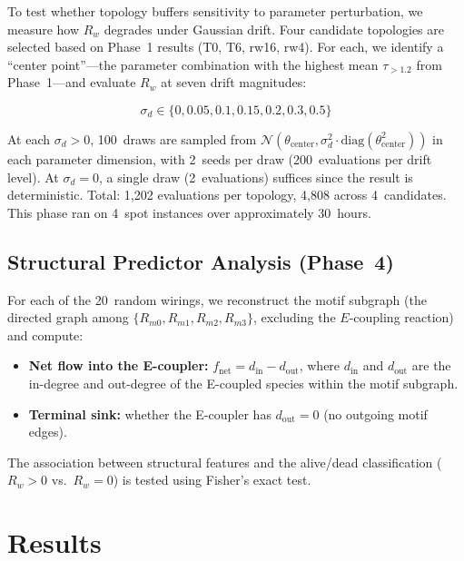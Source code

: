\documentclass[twocolumn,showpacs,preprintnumbers,amsmath,amssymb,prd,floatfix]{revtex4-2}
\newcommand{\tauexp}{\tau_{>1.2}}
\newcommand{\Rw}{R_w}
\renewcommand{\sd}{\sigma_d}
\begin{document}
To test whether topology buffers sensitivity to parameter perturbation, we measure how $\Rw$ degrades under Gaussian drift. Four candidate topologies are selected based on Phase~1 results (T0, T6, rw16, rw4). For each, we identify a ``center point''---the parameter combination with the highest mean $\tauexp$ from Phase~1---and evaluate $\Rw$ at seven drift magnitudes:

\begin{equation}
\sd \in \{0, 0.05, 0.1, 0.15, 0.2, 0.3, 0.5\}
\end{equation}

At each $\sd > 0$, 100~draws are sampled from $\mathcal{N}(\theta_\text{center}, \sd^2 \cdot \text{diag}(\theta_\text{center}^2))$ in each parameter dimension, with 2~seeds per draw (200~evaluations per drift level). At $\sd = 0$, a single draw (2~evaluations) suffices since the result is deterministic. Total: 1{,}202 evaluations per topology, 4{,}808 across 4~candidates. This phase ran on 4~spot instances over approximately 30~hours.

\subsection{Structural Predictor Analysis (Phase~4)}
\label{sec:phase4}

For each of the 20~random wirings, we reconstruct the motif subgraph (the directed graph among $\{R_{m0}, R_{m1}, R_{m2}, R_{m3}\}$, excluding the $E$-coupling reaction) and compute:

\begin{itemize}
\item \textbf{Net flow into the E-coupler:} $f_\text{net} = d_\text{in} - d_\text{out}$, where $d_\text{in}$ and $d_\text{out}$ are the in-degree and out-degree of the E-coupled species within the motif subgraph.
\item \textbf{Terminal sink:} whether the E-coupler has $d_\text{out} = 0$ (no outgoing motif edges).
\end{itemize}

The association between structural features and the alive/dead classification ($\Rw > 0$ vs.\ $\Rw = 0$) is tested using Fisher's exact test.

\section{Results}
\label{sec:results}
\end{document}
